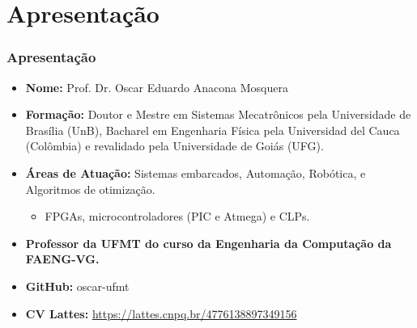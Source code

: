 \documentclass[aspectratio=169]{beamer}
\begin{document}
\section{Apresentação}
\begin{frame}
	
	\frametitle{Apresentação}
	\begin{itemize}
		\justifying
		\item \textbf{Nome:} Prof. Dr. Oscar Eduardo Anacona Mosquera
		\item \textbf{Formação:} Doutor e Mestre em Sistemas Mecatrônicos pela Universidade de Brasília (UnB), Bacharel em Engenharia Física pela Universidad del Cauca (Colômbia) e revalidado pela Universidade de Goiás (UFG).
		\item \textbf{Áreas de Atuação:} Sistemas embarcados, Automação, Robótica, e Algoritmos de otimização.
		\begin{itemize}
			\item FPGAs, microcontroladores (PIC e Atmega) e CLPs.
		\end{itemize}
		
		\item \textbf{Professor da UFMT do curso da Engenharia da Computação da FAENG-VG.}

		\item \textbf{GitHub:} oscar-ufmt
		\item \textbf{CV Lattes:} \url{https://lattes.cnpq.br/4776138897349156}
	\end{itemize}
\end{frame}
\end{document}
